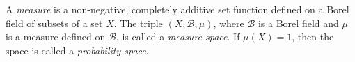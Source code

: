 A \textit{measure} is a non-negative, completely additive set function defined on a Borel field of subsets of a set $X$. The triple $(X, \mathcal{B}, \mu)$, where $\mathcal{B}$ is a Borel field and $\mu$ is a measure defined on $\mathcal{B}$, is called a \textit{measure space}. If $\mu(X) = 1$, then the space is called a \textit{probability space}.
